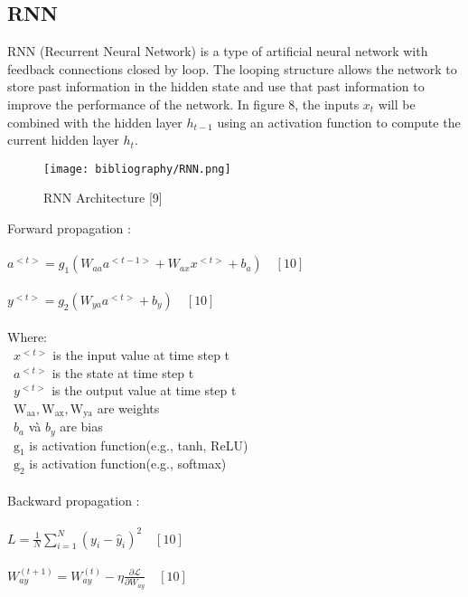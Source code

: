 \documentclass{ieeeojies}
\begin{document}
\subsection{RNN}
RNN (Recurrent Neural Network) is a type of artificial neural network with feedback connections closed by loop. The looping structure allows the network to store past information in the hidden state and use that past information to improve the performance of the network. In figure 8, the inputs \( x_t \) will be combined with the hidden layer \( h_{t-1} \) using an activation function to compute the current hidden layer \( h_t \).

\begin{figure}[H]
  \centering
  \begin{minipage}{1\linewidth}
    \centering
    \texttt{[image: bibliography/RNN.png]}
    \caption{RNN Architecture [9]}
    \label{fig8}
  \end{minipage}
\end{figure}
\noindent Forward propagation :\\
\\$
a^{<t>}=g_1\left(W_{a a} a^{<t-1>}+W_{a x} x^{<t>}+b_a\right)\quad [10]
$\\
\\$
y^{<t>}=g_2\left(W_{y a} a^{<t>}+b_y\right)\quad [10]
$\\
\\Where:\\
\indent\textbullet\ $x^{<t>}$ is the input value at time step t\\
\indent\textbullet\ $a^{<t>}$ is the state at time step t\\
\indent\textbullet\ $y^{<t>}$ is the output value at time step t\\
\indent\textbullet\ $\mathrm{W}_{\mathrm{aa}}, \mathrm{W}_{\mathrm{ax}}, \mathrm{W}_{\mathrm{ya}}$ are weights\\
\indent\textbullet\ $b_a$ và $b_y$ are bias\\
\indent\textbullet\ $\mathrm{g}_1$ is activation function(e.g., tanh, ReLU)\\
\indent\textbullet\ $\mathrm{g}_2$ is activation function(e.g., softmax)\\
\\\noindent Backward propagation :\\
\\$L = \frac{1}{N} \sum_{i=1}^{N} (y_i - \hat{y}_i)^2\quad [10]$\\
\\$W_{a y}^{(t+1)}=W_{a y}^{(t)}-\eta \frac{\partial \mathcal{L}}{\partial W_{a y}}\quad [10]$\\
\end{document}
